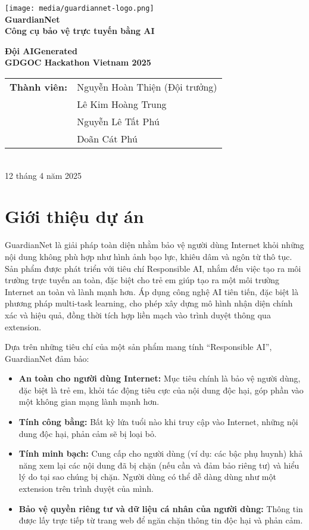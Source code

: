 \documentclass[12pt,a4paper]{article}
\begin{document}
\begin{titlepage}
\centering
\texttt{[image: media/guardiannet-logo.png]}\\[1cm]
{\Huge\bfseries GuardianNet\\[0.5cm]}
{\large\bfseries Công cụ bảo vệ trực tuyến bằng AI\\[2cm]}

{\large\textbf{Đội AIGenerated}\\[0.5cm]}
{\large\textbf{GDGOC Hackathon Vietnam 2025}\\[2cm]}

\begin{tabular}{rl}
\textbf{Thành viên:} & Nguyễn Hoàn Thiện (Đội trưởng) \\
& Lê Kim Hoàng Trung \\
& Nguyễn Lê Tất Phú \\
& Doãn Cát Phú
\end{tabular}\\[2cm]

\vfill
{\large 12 tháng 4 năm 2025}
\end{titlepage}

\tableofcontents
\newpage

\section{Giới thiệu dự án}

GuardianNet là giải pháp toàn diện nhằm bảo vệ người dùng Internet khỏi những nội dung không phù hợp như hình ảnh bạo lực, khiêu dâm và ngôn từ thô tục. Sản phẩm được phát triển với tiêu chí Responsible AI, nhắm đến việc tạo ra môi trường trực tuyến an toàn, đặc biệt cho trẻ em giúp tạo ra một môi trường Internet an toàn và lành mạnh hơn. Áp dụng công nghệ AI tiên tiến, đặc biệt là phương pháp multi-task learning, cho phép xây dựng mô hình nhận diện chính xác và hiệu quả, đồng thời tích hợp liền mạch vào trình duyệt thông qua extension.

Dựa trên những tiêu chí của một sản phẩm mang tính ``Responsible AI'', GuardianNet đảm bảo:

\begin{itemize}
  \item \textbf{An toàn cho người dùng Internet:} Mục tiêu chính là bảo vệ người dùng, đặc biệt là trẻ em, khỏi tác động tiêu cực của nội dung độc hại, góp phần vào một không gian mạng lành mạnh hơn.

  \item \textbf{Tính công bằng:} Bất kỳ lứa tuổi nào khi truy cập vào Internet, những nội dung độc hại, phản cảm sẽ bị loại bỏ.

  \item \textbf{Tính minh bạch:} Cung cấp cho người dùng (ví dụ: các bậc phụ huynh) khả năng xem lại các nội dung đã bị chặn (nếu cần và đảm bảo riêng tư) và hiểu lý do tại sao chúng bị chặn. Người dùng có thể dễ dàng dùng như một extension trên trình duyệt của mình.

  \item \textbf{Bảo vệ quyền riêng tư và dữ liệu cá nhân của người dùng:} Thông tin được lấy trực tiếp từ trang web để ngăn chặn thông tin độc hại và phản cảm.
\end{itemize}
\end{document}
